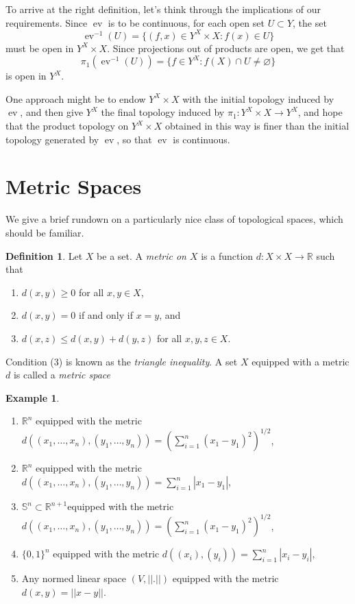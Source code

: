 \documentclass{book}
\theoremstyle{definition}
\newtheorem{definition}{Definition}[section]
\newtheorem{example}{Example}[section]
\theoremstyle{remark}
\newcommand{\R}{\mathbb{R}}
\DeclareMathOperator{\ev}{ev}
\begin{document}
To arrive at the right definition, let's think through the implications of our requirements. Since $\ev$ is to be continuous, for each open set $U\subset Y$, the set
    $$\ev^{-1}(U)=\{(f, x)\in Y^X\times X : f(x)\in U\}$$
must be open in $Y^X\times X$. Since projections out of products are open, we get that
    $$\pi_1(\ev^{-1}(U))=\{f\in Y^X : f(X)\cap U\neq\varnothing\}$$
is open in $Y^X$.

One approach might be to endow $Y^X\times X$ with the initial topology induced by $\ev$, and then give $Y^X$ the final topology induced by $\pi_1:Y^X\times X\to Y^X$, and hope that the product topology on $Y^X\times X$ obtained in this way is finer than the initial topology generated by $\ev$, so that $\ev$ is continuous.

\fi

\section{Metric Spaces}
We give a brief rundown on a particularly nice class of topological spaces, which should be familiar.

\begin{definition}
Let $X$ be a set. A \textit{metric on $X$} is a function $d:X\times X\to\R$ such that
\begin{enumerate}
    \item $d(x,y)\geq 0$ for all $x,y\in X$,
    \item $d(x,y)=0$ if and only if $x=y$, and
    \item $d(x,z)\leq d(x,y)+d(y,z)$ for all $x,y,z\in X$.
\end{enumerate}
Condition (3) is known as the \textit{triangle inequality}. A set $X$ equipped with a metric $d$ is called a \textit{metric space}
\end{definition}

\begin{example}
\begin{enumerate} Some well-known examples of metric spaces.
    \item $\R^n$ equipped with the metric $d((x_1,\hdots,x_n),(y_1,\hdots,y_n))=\left(\sum_{i=1}^n(x_1-y_1)^2\right)^{1/2}$,
    \item $\R^n$ equipped with the metric $d((x_1,\hdots,x_n),(y_1,\hdots,y_n))=\sum_{i=1}^n|x_1-y_1|$,
    \item $\mathbb S^n\subset\R^{n+1}$equipped with the metric $d((x_1,\hdots,x_n),(y_1,\hdots,y_n))=\left(\sum_{i=1}^n(x_1-y_1)^2\right)^{1/2}$,
    \item $\{0,1\}^n$ equipped with the metric $d((x_i),(y_i))=\sum_{i=1}^n |x_i-y_i|$,
    \item Any normed linear space $(V,||.||)$ equipped with the metric $d(x,y)=||x-y||$.
\end{enumerate}
\end{example}
\end{document}
